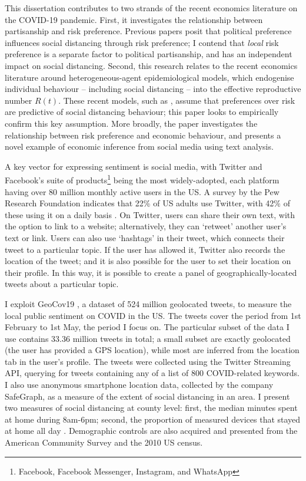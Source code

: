 \documentclass{article}
\begin{document}
This dissertation contributes to two strands of the recent economics literature on the COVID-19 pandemic. First, it investigates the relationship between partisanship and risk preference. Previous papers posit that political preference influences social distancing through risk preference; I contend that \textit{local} risk preference is a separate factor to political partisanship, and has an independent impact on social distancing. Second, this research relates to the recent economics literature around heterogeneous-agent epidemiological models, which endogenise individual behaviour -- including social distancing -- into the effective reproductive number \(R(t)\). These recent models, such as \textcite{acemogluTestingVoluntarySocial2020,brotherhoodEconomicModelCOVID192020,eichenbaumMacroeconomicsEpidemics2020}, assume that preferences over risk are predictive of social distancing behaviour; this paper looks to empirically confirm this key assumption. More broadly, the paper investigates the relationship between risk preference and economic behaviour, and presents a novel example of economic inference from social media using text analysis. 

A key vector for expressing sentiment is social media, with Twitter and Facebook's suite of products\footnote{Facebook, Facebook Messenger, Instagram, and WhatsApp} being the most widely-adopted, each platform having over 80 million monthly active users in the US. A survey by the Pew Research Foundation indicates that 22\% of US adults use Twitter, with 42\% of these using it on a daily basis \parencite{perrinShareAdultsUsing2019}. On Twitter, users can share their own text, with the option to link to a website; alternatively, they can `retweet' another user's text or link. Users can also use `hashtags' in their tweet, which connects their tweet to a particular topic. If the user has allowed it, Twitter also records the location of the tweet; and it is also possible for the user to set their location on their profile. In this way, it is possible to create a panel of geographically-located tweets about a particular topic. 

I exploit GeoCov19 \parencite{qaziGeoCoV19DatasetHundreds2020a}, a dataset of 524 million geolocated tweets, to measure the local public sentiment on COVID in the US. The tweets cover the period from 1st February to 1st May, the period I focus on. The particular subset of the data I use contains 33.36 million tweets in total; a small subset are exactly geolocated (the user has provided a GPS location), while most are inferred from the location tab in the user's profile. The tweets were collected using the Twitter Streaming API, querying for tweets containing any of a list of 800 COVID-related keywords. I also use anonymous smartphone location data, collected by the company SafeGraph, as a measure of the extent of social distancing in an area. I present two measures of social distancing at county level: first, the median minutes spent at home during 8am-6pm; second, the proportion of measured devices that stayed at home all day \parencite{safegraphinc.SocialDistancingMetrics2020}. Demographic controls are also acquired and presented from the American Community Survey and the 2010 US census. 
\end{document}
